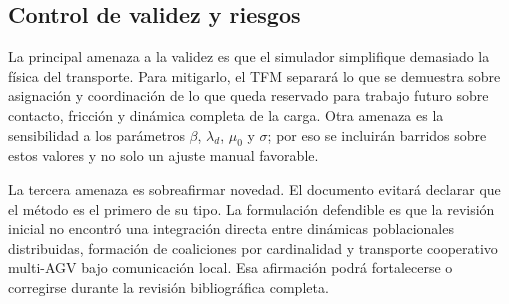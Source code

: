 \documentclass[11pt,a4paper]{article}
\begin{document}
\subsection{Control de validez y riesgos}

La principal amenaza a la validez es que el simulador simplifique demasiado la física del transporte. Para mitigarlo, el TFM separará lo que se demuestra sobre asignación y coordinación de lo que queda reservado para trabajo futuro sobre contacto, fricción y dinámica completa de la carga. Otra amenaza es la sensibilidad a los parámetros $\beta$, $\lambda_d$, $\mu_0$ y $\sigma$; por eso se incluirán barridos sobre estos valores y no solo un ajuste manual favorable.

La tercera amenaza es sobreafirmar novedad. El documento evitará declarar que el método es el primero de su tipo. La formulación defendible es que la revisión inicial no encontró una integración directa entre dinámicas poblacionales distribuidas, formación de coaliciones por cardinalidad y transporte cooperativo multi-AGV bajo comunicación local. Esa afirmación podrá fortalecerse o corregirse durante la revisión bibliográfica completa.

\clearpage


\end{document}
